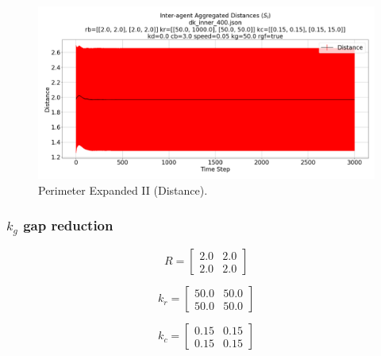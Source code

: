 \documentclass[12pt,a4paper]{IEEEtran}
\newcommand{\kc}{\mathit{k_c}}
\newcommand{\kr}{\mathit{k_r}}
\newcommand{\kg}{\mathit{k_g}}
\newcommand{\rb}{\mathit{R}}
\begin{document}
\begin{figure}[H]
	\begin{center}
		\includegraphics[width=1.0\linewidth]{figures/innerDistanceII}
	\end{center}
	\caption{Perimeter Expanded II (Distance). \label{fig:perimExpandDistanceII}}
\end{figure}

\subsubsection{$\kg$ gap reduction}

\begin{equation}\label{eq:gapReduction1}
	\rb = 
	\begin{bmatrix}
	2.0 & 2.0\\
	2.0 & 2.0
	\end{bmatrix}
	\end{equation}
	
	\begin{equation}\label{eq:gapReduction2}
	\kr = 
	\begin{bmatrix}
	50.0 & 50.0\\
	50.0 & 50.0
	\end{bmatrix}
	\end{equation}
	
	\begin{equation}\label{eq:gapReduction3}
	\kc = 
	\begin{bmatrix}
	0.15 & 0.15\\
	0.15 & 0.15 
	\end{bmatrix}
	\end{equation}
\end{document}
